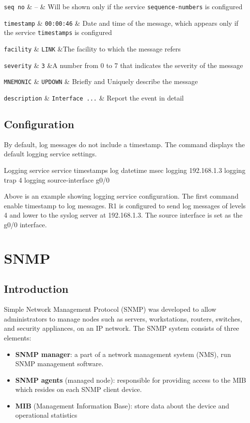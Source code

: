 \verb|seq no| & -- & Will be shown only if the service \verb|sequence-numbers| is configured \w

\verb|timestamp| & \verb|00:00:46| & Date and time of the message, which appears only if the service \verb|timestamps| is configured \w

\verb|facility| & \verb|LINK| &The facility to which the message refers \w

\verb|severity| &  \verb|3| &A number from 0 to 7  that indicates the severity of the message \w

\verb|MNEMONIC| & \verb|UPDOWN| & Briefly and Uniquely describe the message\w

\verb|description| & \verb|Interface ...| & Report the event in detail\w
\tableEnd

\subsection{Configuration}

By default, log messages do not include a timestamp. The  command displays the default logging service settings.\\

\begin{sexylisting}{Logging service}
service timestamps log datetime msec
logging 192.168.1.3
logging trap 4
logging source-interface g0/0
\end{sexylisting}

Above is an example showing logging service configuration. The first command enable timestamp to log messages. R1 is configured to send log messages of levels 4 and lower to the syslog server at 192.168.1.3. The source interface is set as the g0/0 interface.

\section{SNMP}

\subsection{Introduction}

Simple Network Management Protocol (SNMP) was developed to allow administrators to manage nodes such as servers, workstations, routers, switches, and security appliances, on an IP network. The SNMP system consists of three elements:

\begin{itemize}
\item \textbf{SNMP manager}: a part of a network management system (NMS), run SNMP management software. 
\item \textbf{SNMP agents} (managed node):  responsible for providing access to the MIB which resides on each SNMP client device.
\item \textbf{MIB} (Management Information Base): store data about the device and operational statistics 
\end{itemize}

